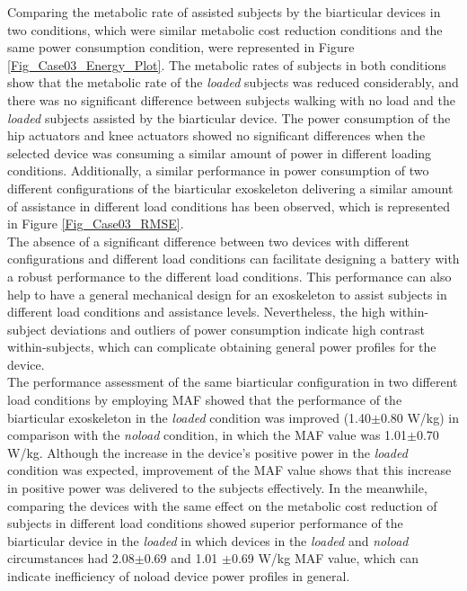 \documentclass[10pt,letterpaper]{article}
\begin{document}
Comparing the metabolic rate of assisted subjects by the biarticular devices in two conditions, which were similar metabolic cost reduction conditions and the same power consumption condition, were represented in Figure \ref{Fig_Case03_Energy_Plot}. The metabolic rates of subjects in both conditions show that the metabolic rate of the {\it loaded} subjects was reduced considerably, and there was no significant difference between subjects walking with no load and the {\it loaded} subjects assisted by the biarticular device. The power consumption of the hip actuators and knee actuators showed no significant differences when the selected device was consuming a similar amount of power in different loading conditions. Additionally, a similar performance in power consumption of two different configurations of the biarticular exoskeleton delivering a similar amount of assistance in different load conditions has been observed, which is represented in Figure \ref{Fig_Case03_RMSE}.\\
The absence of a significant difference between two devices with different configurations and different load conditions can facilitate designing a battery with a robust performance to the different load conditions. This performance can also help to have a general mechanical design for an exoskeleton to assist subjects in different load conditions and assistance levels. Nevertheless, the high within-subject deviations and outliers of power consumption indicate high contrast within-subjects, which can complicate obtaining general power profiles for the device.\\
The performance assessment of the same biarticular configuration in two different load conditions by employing MAF showed that the performance of the biarticular exoskeleton in the {\it loaded} condition was improved (1.40$\pm$0.80 W/kg) in comparison with the  {\it noload} condition, in which the MAF value was 1.01$\pm$0.70 W/kg. Although the increase in the device's positive power in the {\it loaded} condition was expected, improvement of the MAF value shows that this increase in positive power was delivered to the subjects effectively. In the meanwhile, comparing the devices with the same effect on the metabolic cost reduction of subjects in different load conditions showed superior performance of the biarticular device in the {\it loaded} in which devices in the {\it loaded} and {\it noload} circumstances had  2.08$\pm$0.69 and 1.01 $\pm$0.69 W/kg MAF value, which can indicate inefficiency of noload device power profiles in general.\\
\end{document}
